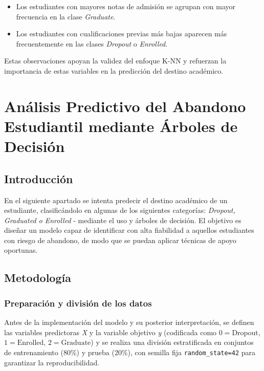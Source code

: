 \documentclass{report}[14pt]
\begin{document}
\begin{itemize}
  \item Los estudiantes con mayores notas de admisión se agrupan con mayor frecuencia en la clase \textit{Graduate}.
  \item Los estudiantes con cualificaciones previas más bajas aparecen más frecuentemente en las clases \textit{Dropout} o \textit{Enrolled}.
\end{itemize}

Estas observaciones apoyan la validez del enfoque K-NN y refuerzan la importancia de estas variables en la predicción del destino académico.

\chapter{Análisis Predictivo del Abandono Estudiantil mediante Árboles de Decisión}

\section{Introducción}
En el siguiente apartado se intenta predecir el destino académico de un estudiante, clasificándolo en algunas de los siguientes categorías: \textit{Dropout, Graduated o Enrolled} - mediante el uso y árboles de decisión. El objetivo es diseñar un modelo capaz de identificar con alta fiabilidad a aquellos estudiantes con riesgo de abandono, de modo que se puedan aplicar técnicas de apoyo oportunas.

\section{Metodología}
\subsection{Preparación y división de los datos}
Antes de la implementación del modelo y su posterior interpretación, se definen las variables predictoras \textit{X} y la variable objetivo \textit{y} (codificada como $0=\mathrm{Dropout}$, $1=\mathrm{Enrolled}$, $2=\mathrm{Graduate}$) y se realiza una división estratificada en conjuntos de entrenamiento (80\%) y prueba (20\%), con semilla fija \texttt{random\_state=42} para garantizar la reproducibilidad.
\end{document}
